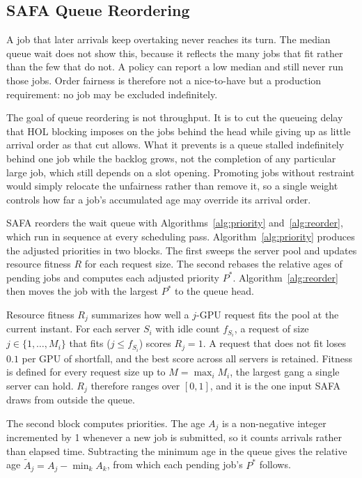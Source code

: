 \documentclass{ieeetj}
\begin{document}
\subsection{SAFA Queue Reordering}
A job that later arrivals keep overtaking never reaches its turn. The median queue wait does not show this, because it reflects the many jobs that fit rather than the few that do not. A policy can report a low median and still never run those jobs. Order fairness is therefore not a nice-to-have but a production requirement: no job may be excluded indefinitely.

The goal of queue reordering is not throughput. It is to cut the queueing delay that HOL blocking imposes on the jobs behind the head while giving up as little arrival order as that cut allows. What it prevents is a queue stalled indefinitely behind one job while the backlog grows, not the completion of any particular large job, which still depends on a slot opening. Promoting jobs without restraint would simply relocate the unfairness rather than remove it, so a single weight controls how far a job's accumulated age may override its arrival order.

SAFA reorders the wait queue with Algorithms~\ref{alg:priority} and~\ref{alg:reorder}, which run in sequence at every scheduling pass. Algorithm~\ref{alg:priority} produces the adjusted priorities in two blocks. The first sweeps the server pool and updates resource fitness $R$ for each request size. The second rebases the relative ages of pending jobs and computes each adjusted priority $P^*$. Algorithm~\ref{alg:reorder} then moves the job with the largest $P^*$ to the queue head.

Resource fitness $R_j$ summarizes how well a $j$-GPU request fits the pool at the current instant. For each server $S_i$ with idle count $f_{S_i}$, a request of size $j\in\{1,\dots,M_i\}$ that fits ($j\le f_{S_i}$) scores $R_j=1$. A request that does not fit loses $0.1$ per GPU of shortfall, and the best score across all servers is retained. Fitness is defined for every request size up to $M=\max_i M_i$, the largest gang a single server can hold. $R_j$ therefore ranges over $[0,1]$, and it is the one input SAFA draws from outside the queue.

The second block computes priorities. The age $A_j$ is a non-negative integer incremented by 1 whenever a new job is submitted, so it counts arrivals rather than elapsed time. Subtracting the minimum age in the queue gives the relative age $\tilde A_j=A_j-\min_k A_k$, from which each pending job's $P^*$ follows.
\end{document}
